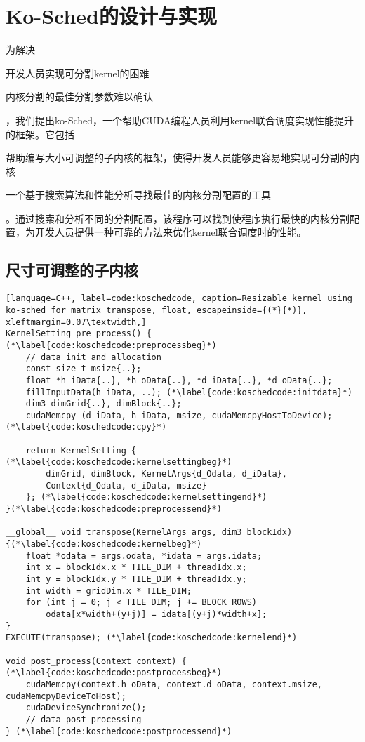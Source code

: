 \chapter{Ko-Sched的设计与实现}\label{chapter:design-implementation}

为解决
\begin{enumerate*}[label=\roman*),itemjoin={\quad}]
    \item 开发人员实现可分割kernel的困难
    \item 内核分割的最佳分割参数难以确认
\end{enumerate*}
，我们提出ko-Sched，一个帮助CUDA编程人员利用kernel联合调度实现性能提升的框架。它包括
\begin{enumerate*}[label=\roman*),itemjoin={\quad}]
    \item 帮助编写大小可调整的子内核的框架，使得开发人员能够更容易地实现可分割的内核
    \item 一个基于搜索算法和性能分析寻找最佳的内核分割配置的工具
\end{enumerate*}
。通过搜索和分析不同的分割配置，该程序可以找到使程序执行最快的内核分割配置，为开发人员提供一种可靠的方法来优化kernel联合调度时的性能。

\section{尺寸可调整的子内核}

\begin{lstlisting}[language=C++, label=code:koschedcode, caption=Resizable kernel using ko-sched for matrix transpose, float, escapeinside={(*}{*)}, xleftmargin=0.07\textwidth,]
KernelSetting pre_process() { (*\label{code:koschedcode:preprocessbeg}*)
    // data init and allocation
    const size_t msize{..};
    float *h_iData{..}, *h_oData{..}, *d_iData{..}, *d_oData{..};
    fillInputData(h_iData, ..); (*\label{code:koschedcode:initdata}*)
    dim3 dimGrid{..}, dimBlock{..};
    cudaMemcpy (d_iData, h_iData, msize, cudaMemcpyHostToDevice); (*\label{code:koschedcode:cpy}*)

    return KernelSetting { (*\label{code:koschedcode:kernelsettingbeg}*)
        dimGrid, dimBlock, KernelArgs{d_Odata, d_iData}, 
        Context{d_Odata, d_iData, msize}
    }; (*\label{code:koschedcode:kernelsettingend}*)
}(*\label{code:koschedcode:preprocessend}*)

__global__ void transpose(KernelArgs args, dim3 blockIdx){(*\label{code:koschedcode:kernelbeg}*)
    float *odata = args.odata, *idata = args.idata;
    int x = blockIdx.x * TILE_DIM + threadIdx.x;
    int y = blockIdx.y * TILE_DIM + threadIdx.y;
    int width = gridDim.x * TILE_DIM;
    for (int j = 0; j < TILE_DIM; j += BLOCK_ROWS)
        odata[x*width+(y+j)] = idata[(y+j)*width+x];
}
EXECUTE(transpose); (*\label{code:koschedcode:kernelend}*)

void post_process(Context context) { (*\label{code:koschedcode:postprocessbeg}*)
    cudaMemcpy(context.h_oData, context.d_oData, context.msize, cudaMemcpyDeviceToHost);
    cudaDeviceSynchronize();
    // data post-processing
} (*\label{code:koschedcode:postprocessend}*)
\end{lstlisting}

